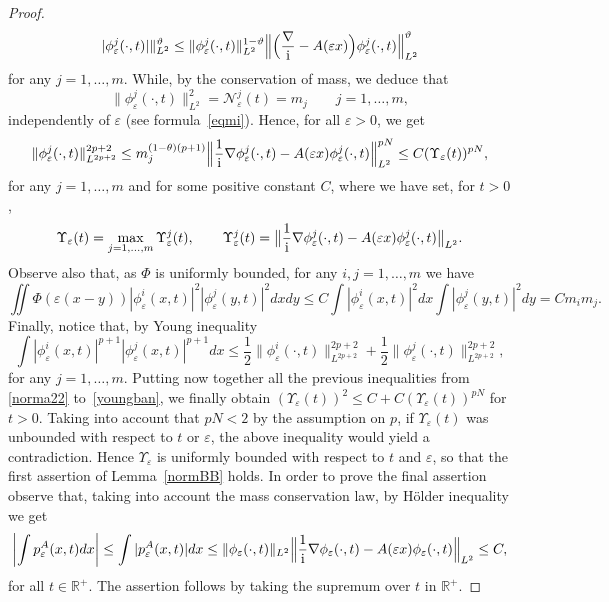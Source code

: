 \documentclass[11pt]{amsart}
\numberwithin{equation}{section}
\theoremstyle{definition}
\begin{document}
\begin{proof}
$$|\phi_{\varepsilon}^j(\cdot,t)|\|^{\vartheta}_{L^{2}}\leq
\|\phi_{\varepsilon}^j(\cdot,t)\|_{L^{2}}^{1-\vartheta}
\Big\|\Big(\frac{\nabla}{{\rm i}}-A({\varepsilon}
x)\Big)\phi_{\varepsilon}^j(\cdot,t)\Big\|^{\vartheta}_{L^{2}}
$$
for any $j=1,\dots,m$. While, by the conservation of mass, we
deduce that $$\|\phi_{\varepsilon}^j(\cdot,t)\|_{L^2}^2 ={\mathcal
N}_{\varepsilon}^j(t)=m_j\qquad j=1,\dots,m,$$ independently of ${\varepsilon}$ (see
formula~\eqref{eqmi}). Hence, for all ${\varepsilon}>0$, we get
\begin{equation}\label{diamagnetica}
\|\phi_{\varepsilon}^j(\cdot,t)\|_{L^{2p+2}}^{2p+2} \leq
m_j^{(1-\theta)(p+1)}\Big\|\frac{1}{{\rm i}}\nabla\phi_{\varepsilon}^j(\cdot,t)-A({\varepsilon}
x)\phi_{\varepsilon}^j(\cdot,t)\Big\|^{pN}_{L^{2}}\leq
C(\Upsilon_{\varepsilon}(t))^{pN},
\end{equation}
for any $j=1,\dots,m$ and for some positive constant $C$, where we
have set, for $t>0$,
$$
\Upsilon_{\varepsilon}(t)=\max_{j=1,\dots,m}\Upsilon^j_{\varepsilon}(t),\qquad
\Upsilon^j_{\varepsilon}(t)=\big\|\frac{1}{{\rm i}}\nabla\phi_{\varepsilon}^j(\cdot,t)-A({\varepsilon}
x)\phi_{\varepsilon}^j(\cdot,t)\big\|_{L^{2}}.
$$
Observe also that, as $\Phi$ is uniformly bounded, for any $i,j=1,\dots,m$ we have
\begin{equation*}
 \iint \Phi({\varepsilon}(x-y))|\phi_{\varepsilon}^i(x,t)|^2|\phi_{\varepsilon}^j(y,t)|^2 dxdy
 \leq C \int |\phi_{\varepsilon}^i(x,t)|^2dx \int |\phi_{\varepsilon}^j(y,t)|^2 dy=C m_im_j.
\end{equation*}
Finally, notice that, by Young inequality
\begin{equation}
    \label{youngban}
\int |\phi_{\varepsilon}^i(x,t)|^{p+1}|\phi_{\varepsilon}^j(x,t)|^{p+1}dx\leq
\frac{1}{2}\|\phi_{\varepsilon}^i(\cdot,t)\|^{2p+2}_{L^{2p+2}}
+\frac{1}{2}\|\phi_{\varepsilon}^j(\cdot,t)\|^{2p+2}_{L^{2p+2}},
\end{equation}
for any $j=1,\dots,m$.
Putting now together all the previous inequalities from
\eqref{norma22} to~\eqref{youngban},
we finally obtain $(\Upsilon_{\varepsilon}(t))^2\leq C+C(\Upsilon_{\varepsilon}(t))^{pN}$
for $t>0$.
Taking into account that $pN<2$ by the assumption on $p$, if
$\Upsilon_{\varepsilon}(t)$ was unbounded with respect to $t$ or ${\varepsilon}$, the above
inequality would yield a contradiction. Hence $\Upsilon_{\varepsilon}$ is
uniformly bounded with respect to $t$ and ${\varepsilon}$, so that
the first assertion of Lemma~\ref{normBB} holds.
In order to prove the final assertion observe that, taking into
account the mass conservation law, by
H\"older inequality we get
\begin{equation*}
\left|\int p^A_{\varepsilon}(x,t)dx\right| \leq \int |p^A_{\varepsilon}(x,t)|dx\leq
\|\phi_{\varepsilon}(\cdot,t)\|_{L^2}\Big\|\frac{1}{{\rm i}}
\nabla\phi_{\varepsilon}(\cdot,t)-A({\varepsilon}
x)\phi_{\varepsilon}(\cdot,t)\Big\|_{L^2}\leq C,
\end{equation*}
for all $t\in{{\mathbb R}}^+$. The assertion follows by taking the supremum
over $t$ in ${{\mathbb R}}^+$.
\end{proof}
\end{document}
